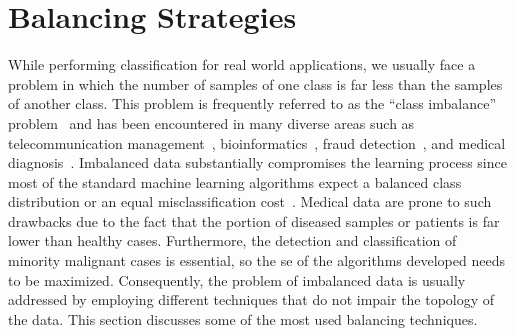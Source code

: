 \section{Balancing Strategies} \label{sec:chp2-sec5}

While performing classification for real world applications, we usually face a problem in which the number of samples of one class is far less than the samples of another class.
This problem is frequently referred to as the ``class imbalance'' problem~\cite{prati2009data} and has been encountered in many diverse areas such as telecommunication management~\cite{ezawa1996learning}, bioinformatics~\cite{radivojac2004classification}, fraud detection~\cite{phua2004minority}, and medical diagnosis~\cite{celebi2007methodological}. 
Imbalanced data substantially compromises the learning process since most of the standard machine learning algorithms expect a balanced class distribution or an equal misclassification cost~\cite{he2009learning}.
Medical data are prone to such drawbacks due to the fact that the portion of diseased samples or patients is far lower than healthy cases.
Furthermore, the detection and classification of minority malignant cases is essential, so the \ac{se} of the algorithms developed needs to be maximized.
Consequently, the problem of imbalanced data is usually addressed by employing different techniques that do not impair the topology of the data.
This section discusses some of the most used balancing techniques.

